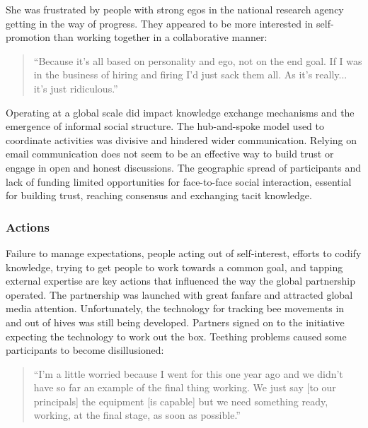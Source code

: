 She was frustrated by people with strong egos in the national research agency getting in the way of progress. They appeared to be more interested in self-promotion than working together in a collaborative manner: 

\begin{quote}
\small
\enquote{Because it's all based on personality and ego, not on the end goal. If I was in the business of hiring and firing I'd just sack them all. As it's really... it's just ridiculous.} \\
\end{quote}

Operating at a global scale did impact knowledge exchange mechanisms and the emergence of informal social structure. The hub-and-spoke model used to coordinate activities was divisive and hindered wider communication. Relying on email communication does not seem to be an effective way to build trust or engage in open and honest discussions. The geographic spread of participants and lack of funding limited opportunities for face-to-face social interaction, essential for building trust, reaching consensus and exchanging tacit knowledge. 

\subsubsection{Actions}

Failure to manage expectations, people acting out of self-interest, efforts to codify knowledge, trying to get people to work towards a common goal, and tapping external expertise are key actions that influenced the way the global partnership operated. The partnership was launched with great fanfare and attracted global media attention. Unfortunately, the technology for tracking bee movements in and out of hives was still being developed. Partners signed on to the initiative expecting the technology to work out the box. Teething problems caused some participants to become disillusioned:

\begin{quote}
\small
\enquote{I'm a little worried because I went for this one year ago and we didn't have so far an example of the final thing working. We just say [to our principals] the equipment [is capable] but we need something ready, working, at the final stage, as soon as possible.} \\
\end{quote}

